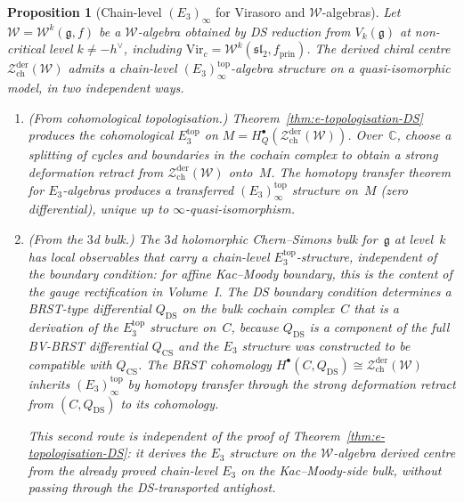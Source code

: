 \documentclass[11pt,reqno]{amsart}
\newtheorem{proposition}[theorem]{Proposition}
\theoremstyle{definition}
\theoremstyle{remark}
\providecommand{\cW}{\mathcal{W}}
\providecommand{\cZ}{\mathcal{Z}}
\providecommand{\fg}{\mathfrak{g}}
\providecommand{\Ethree}{E_3}
\providecommand{\bC}{\mathbb{C}}
\begin{document}
\begin{proposition}[Chain-level $(\Ethree)_\infty$
for Virasoro and $\cW$-algebras]
\label{prop:e-chain-level-virasoro}
Let $\cW = \cW^k(\fg, f)$ be a $\cW$-algebra obtained
by DS reduction from $V_k(\fg)$ at non-critical level
$k \neq -h^\vee$, including $\mathrm{Vir}_c =
\cW^k(\mathfrak{sl}_2, f_{\mathrm{prin}})$. The derived
chiral centre
$\cZ^{\mathrm{der}}_{\mathrm{ch}}(\cW)$ admits a
chain-level $(\Ethree)_\infty^{\mathrm{top}}$-algebra
structure on a quasi-isomorphic model, in two
independent ways.
\begin{enumerate}[label=\textup{(\roman*)}]
\item \textup{(From cohomological topologisation.)}
  Theorem~\textup{\ref{thm:e-topologisation-DS}} produces
  the cohomological $\Ethree^{\mathrm{top}}$ on
  $M = H_Q^\bullet(\cZ^{\mathrm{der}}_{\mathrm{ch}}(\cW))$.
  Over~$\bC$, choose a splitting of cycles and boundaries in
  the cochain complex to obtain a strong deformation retract
  from $\cZ^{\mathrm{der}}_{\mathrm{ch}}(\cW)$ onto~$M$.
  The homotopy transfer theorem for $\Ethree$-algebras
  produces a transferred $(\Ethree)_\infty^{\mathrm{top}}$
  structure on~$M$ \textup{(}zero differential\textup{)},
  unique up to $\infty$-quasi-isomorphism.

\item \textup{(From the $3$d bulk.)}
  The $3$d holomorphic Chern--Simons bulk for~$\fg$
  at level~$k$ has local observables that carry a
  chain-level $\Ethree^{\mathrm{top}}$-structure, independent
  of the boundary condition: for affine Kac--Moody boundary,
  this is the content of the gauge rectification in Volume~I.
  The DS boundary condition determines a
  BRST-type differential $Q_{\mathrm{DS}}$ on the bulk
  cochain complex~$C$ that is a derivation of the
  $\Ethree^{\mathrm{top}}$ structure on~$C$,
  because $Q_{\mathrm{DS}}$ is a component of the full
  BV-BRST differential $Q_{\mathrm{CS}}$ and the
  $\Ethree$ structure was constructed to be compatible
  with $Q_{\mathrm{CS}}$.
  The BRST cohomology $H^\bullet(C, Q_{\mathrm{DS}}) \cong
  \cZ^{\mathrm{der}}_{\mathrm{ch}}(\cW)$
  inherits $(\Ethree)_\infty^{\mathrm{top}}$ by homotopy
  transfer through the strong deformation retract from
  $(C, Q_{\mathrm{DS}})$ to its cohomology.

  This second route is independent of the proof of
  Theorem~\textup{\ref{thm:e-topologisation-DS}}: it
  derives the $\Ethree$ structure on the $\cW$-algebra
  derived centre from the \emph{already proved} chain-level
  $\Ethree$ on the Kac--Moody-side bulk, without passing
  through the DS-transported antighost.
\end{enumerate}
\end{proposition}
\end{document}
